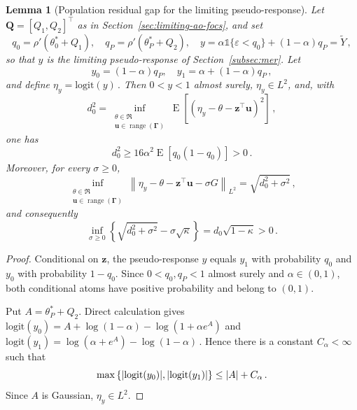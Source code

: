 \documentclass{article}
\makeatletter
\DeclareMathOperator{\expect}{E}
\newtheorem{lemma}{Lemma}
\theoremstyle{definition}
\newcommand{\abs}[1]{%
	\ensuremath{%
		\if@display
		\left| #1 \right|
		\else
		\lvert #1 \rvert
		\fi
	}%
}
\newcommand*{\bb}{\boldsymbol}
\newcommand{\logit}[1]{\ensuremath{\textrm{logit}(#1)}}
\def\bu{\bb{u}}
\def\Ytil{\widetilde{Y}}
\def\bz{\bb{z}}
\newcommand{\range}{\operatorname{range}}
\makeatother
\begin{document}
\begin{bibunit}
\begin{lemma}[Population residual gap for the limiting pseudo-response]
\label{lemma:limiting_AO_population_gap}
Let $\bb Q = [Q_1, Q_2]^\top$ as in Section~\ref{sec:limiting-ao-focs}, and set
$$
    q_0=\rho'(\theta_0^*+Q_1),
    \quad
    q_P=\rho'(\theta_P^*+Q_2),
    \quad
    y
    =
    \alpha\mathds{1}\{\varepsilon<q_0\}+(1-\alpha)q_P
    =
    \Ytil\,,
$$
so that $y$ is the limiting pseudo-response of
Section~\ref{subsec:mer}. Let
$$
    y_0=(1-\alpha)q_P,
    \quad
    y_1=\alpha+(1-\alpha)q_P\,,
$$
and define $\eta_y=\logit{y}\,.$
Then $0<y<1$ almost surely, $\eta_y\in L^2$, and, with
\begin{equation}
\label{eq:limiting_AO_d0}
    d_0^2
    =
    \underset{\substack{
    \theta\in\Re\\
    \bu\in\range(\bb\Gamma)
    }}{\inf}
    \expect\left[
        \left(
            \eta_y-\theta-\bz^\top\bu
        \right)^2
    \right]\,,
\end{equation}
one has
\begin{equation}
\label{eq:limiting_AO_d0_lower}
    d_0^2
    \geq
    16\alpha^2\expect[q_0(1-q_0)]
    >0\,.
\end{equation}
Moreover, for every $\sigma\geq0$,
\begin{equation}
\label{eq:limiting_AO_sigma_distance}
    \underset{\substack{
    \theta\in\Re\\
    \bu\in\range(\bb\Gamma)
    }}{\inf}
    \left\|
        \eta_y-\theta-\bz^\top\bu-\sigma G
    \right\|_{L^2}
    =
    \sqrt{d_0^2+\sigma^2}\,,
\end{equation}
and consequently
\begin{equation}
\label{eq:limiting_AO_uniform_radius_gap}
    \underset{\sigma\geq0}{\inf}
    \left
    \{
        \sqrt{d_0^2+\sigma^2}
        -\sigma\sqrt\kappa
    \right\}
    =
    d_0\sqrt{1-\kappa}
    >0\,.
\end{equation}
\end{lemma}

\begin{proof}
Conditional on $\bz$, the pseudo-response $y$ equals $y_1$ with
probability $q_0$ and $y_0$ with probability $1-q_0$. Since
$0<q_0,q_P<1$ almost surely and $\alpha\in(0,1)$, both conditional atoms
have positive probability and belong to $(0,1)$.

Put $A=\theta_P^*+Q_2$. Direct calculation gives $\logit{y_0} = A+\log(1-\alpha)-\log(1+\alpha e^A)$
and $\logit{y_1} = \log(\alpha+e^A)-\log(1-\alpha)\,.$
Hence there is a constant $C_\alpha<\infty$ such that
$$
    \max\left
    \{
        \abs{\logit{y_0}},
        \abs{\logit{y_1}}
    \right\}
    \leq
    \abs A+C_\alpha\,.
$$
Since $A$ is Gaussian, $\eta_y\in L^2$.


\end{proof}
\end{bibunit}
\end{document}

